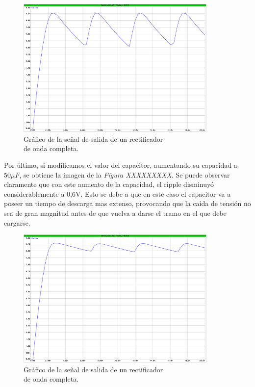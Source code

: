 \documentclass{article}
\begin{document}
\newpage
\begin{figure}[h]
	\centering
	\includegraphics[width=0.88\textwidth]{images/4-4-8-grafico-circuito-rectificador-onda-completa-con-filtro.jpg}
	\medskip
	\caption{Gráfico de la señal de salida de un rectificador\\ de onda completa.}
\end{figure}
\bigskip\bigskip


	Por último, si modificamos el valor del capacitor, aumentando su capacidad a $50\mu F$, se obtiene la imagen de la \textit{Figura XXXXXXXXX}. Se puede observar claramente que con este aumento de la capacidad, el ripple disminuyó considerablemente a 0,6V. Esto se debe a que en este caso el capacitor va a poseer un tiempo de descarga mas extenso, provocando que la caída de tensión no sea de gran magnitud antes de que vuelva a darse el tramo en el que debe cargarse. 
\bigskip\bigskip


\newpage
\begin{figure}[h]
	\centering
	\includegraphics[width=0.88\textwidth]{images/4-4-9-grafico-circuito-rectificador-onda-completa-con-filtro-alt.jpg}
	\medskip
	\caption{Gráfico de la señal de salida de un rectificador\\ de onda completa.}
\end{figure}
\bigskip\bigskip
\end{document}

